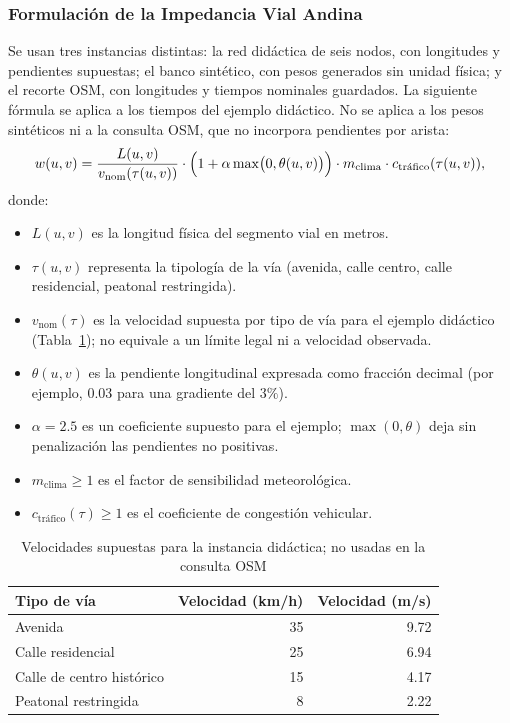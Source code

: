 \subsubsection{Formulación de la Impedancia Vial Andina}
Se usan tres instancias distintas: la red didáctica de seis nodos, con longitudes y pendientes supuestas; el banco sintético, con pesos generados sin unidad física; y el recorte OSM, con longitudes y tiempos nominales guardados. La siguiente fórmula se aplica a los tiempos del ejemplo didáctico. No se aplica a los pesos sintéticos ni a la consulta OSM, que no incorpora pendientes por arista:
\begin{equation}
    w(u, v) = \frac{L(u, v)}{v_{\text{nom}}(\tau(u, v))} \cdot \Bigl(1 + \alpha \max\bigl(0, \theta(u, v)\bigr)\Bigr) \cdot m_{\text{clima}} \cdot c_{\text{tráfico}}(\tau(u, v)),
    \label{eq:costo}
\end{equation}
donde:
\begin{itemize}
    \item $L(u, v)$ es la longitud física del segmento vial en metros.
    \item $\tau(u, v)$ representa la tipología de la vía (avenida, calle centro, calle residencial, peatonal restringida).
    \item $v_{\text{nom}}(\tau)$ es la velocidad supuesta por tipo de vía para el ejemplo didáctico (Tabla~\ref{tab:velocidades}); no equivale a un límite legal ni a velocidad observada.
    \item $\theta(u, v)$ es la pendiente longitudinal expresada como fracción decimal (por ejemplo, $0.03$ para una gradiente del $3\%$).
    \item $\alpha = 2.5$ es un coeficiente supuesto para el ejemplo; $\max(0, \theta)$ deja sin penalización las pendientes no positivas.
    \item $m_{\text{clima}} \ge 1$ es el factor de sensibilidad meteorológica.
    \item $c_{\text{tráfico}}(\tau) \ge 1$ es el coeficiente de congestión vehicular.
\end{itemize}

\begin{table}[H]
    \centering
    \fontsize{9.5}{11.5}\selectfont
    \caption{Velocidades supuestas para la instancia didáctica; no usadas en la consulta OSM}
    \label{tab:velocidades}
    \begin{tabular}{@{}lrr@{}}
        \toprule
        \textbf{Tipo de vía} & \textbf{Velocidad (km/h)} & \textbf{Velocidad (m/s)} \\
        \midrule
        Avenida & 35 & 9.72 \\
        Calle residencial & 25 & 6.94 \\
        Calle de centro histórico & 15 & 4.17 \\
        Peatonal restringida & 8 & 2.22 \\
        \bottomrule
    \end{tabular}
\end{table}

